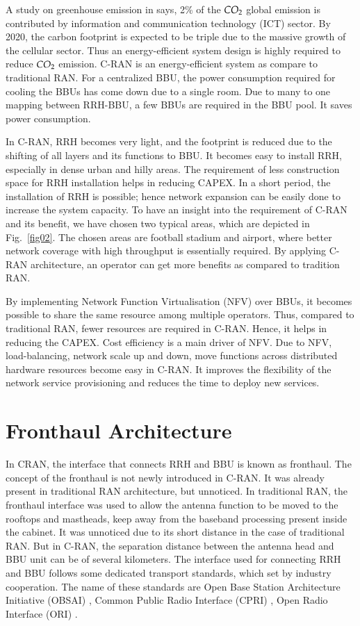 \begin{multicols}{2}
A study on greenhouse emission in \cite{art3-key33} says, 2\% of the $CO_{\rm 2}$ global emission is contributed by information and communication technology (ICT) sector. By 2020, the carbon footprint is expected to be triple due to the massive growth of the cellular sector. Thus an energy-efficient system design is highly required to reduce $CO_{\rm 2}$ emission. C-RAN is an energy-efficient system as compare to traditional RAN. For a centralized BBU, the power consumption required for cooling the BBUs has come down due to a single room. Due to many to one mapping between RRH-BBU, a few BBUs are required in the BBU pool. It saves power consumption. 

In C-RAN, RRH becomes very light, and the footprint is reduced due to the shifting of all layers and its functions to BBU. It becomes easy to install RRH, especially in dense urban and hilly areas. The requirement of less construction space for RRH installation helps in reducing CAPEX. In a short period, the installation of RRH is possible; hence network expansion can be easily done to increase the system capacity. To have an insight into the requirement of C-RAN and its benefit, we have chosen two typical areas, which are depicted in Fig.~\ref{fig02}. The chosen areas are football stadium and airport, where better network coverage with high throughput is essentially required. By applying C-RAN architecture, an operator can get more benefits as compared to tradition RAN. 

By implementing Network Function Virtualisation (NFV) over BBUs, it becomes possible to share the same resource among multiple operators. Thus, compared to traditional RAN, fewer resources are required in C-RAN. Hence, it helps in reducing the CAPEX. Cost efficiency is a main driver of NFV. Due to NFV, load-balancing, network scale up and down, move functions across distributed hardware resources become easy in C-RAN. It improves the flexibility of the network service provisioning and reduces the time to deploy new services.

\section{Fronthaul Architecture}\label{sect04}

In CRAN, the interface that connects RRH and BBU is known as fronthaul. The concept of the fronthaul is not newly introduced in C-RAN. It was already present in traditional RAN architecture, but unnoticed. In traditional RAN, the fronthaul interface was used to allow the antenna function to be moved to the rooftops and mastheads, keep away from the baseband processing present inside the cabinet. It was unnoticed due to its short distance in the case of traditional RAN. But in C-RAN, the separation distance between the antenna head and BBU unit can be of several kilometers. The interface used for connecting RRH and BBU follows some dedicated transport standards, which set by industry cooperation. The name of these standards are Open Base Station Architecture Initiative (OBSAI) \cite{art3-key34}, Common Public Radio Interface (CPRI) \cite{art3-key35}, Open Radio Interface (ORI) \cite{art3-key36}. 


\end{multicols}
